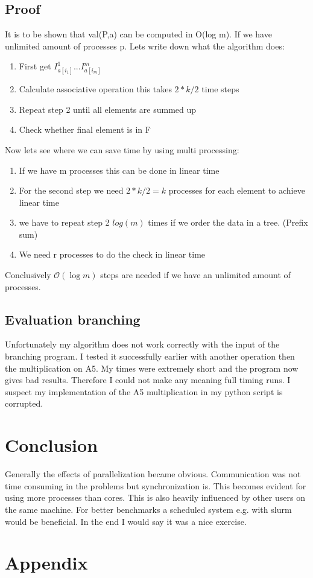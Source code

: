 \documentclass[11pt]{article} %
\begin{document}
\subsection{Proof}
It is to be shown that val(P,a) can be computed in O(log m). If we have unlimited amount of
processes p. 
Lets write down what the algorithm does:
\begin{enumerate}
\item First get $I^{1}_{a[i_1]} ... I^{m}_{a[i_m]}$
\item Calculate associative operation this takes $2*k/2$ time steps
\item Repeat step 2 until all elements are summed up 
\item Check whether final element is in F
\end{enumerate}
Now lets see where we can save time by using multi processing:
\begin{enumerate}
\item If we have m processes this can be done in linear time
\item For the second step we need $2*k/2 = k$ processes for each element to achieve linear time 
\item we have to repeat step 2 $log(m)$ times if we order the data in a tree. (Prefix sum)
\item We need r processes to do the check in linear time
\end{enumerate}
Conclusively $\mathcal{O}(\log{m})$ steps are needed if we have an unlimited amount of processes. 

\subsection{Evaluation branching}
Unfortunately my algorithm does not work correctly with the input of the branching program. I
tested it successfully earlier with another operation then the multiplication on A5. My times were
extremely short and the program now gives bad results. Therefore I could not make any meaning full
timing runs. I suspect my implementation of the A5 multiplication in my python script is corrupted.  

\section{Conclusion}
Generally the effects of parallelization became obvious. Communication was not time consuming in the
problems but synchronization is. This becomes evident for using more processes than cores. This is
also heavily influenced by other users on the same machine. For better benchmarks a scheduled system
e.g. with slurm would be beneficial. 
In the end I would say it was a nice exercise. 
\section{Appendix}

\newpage

\end{document}
